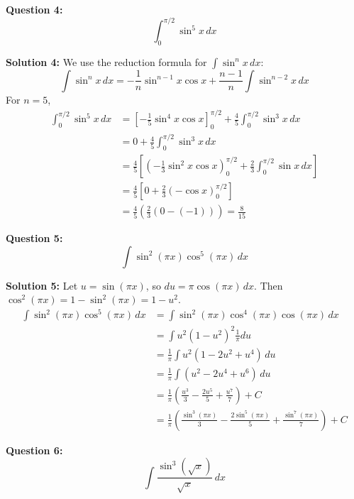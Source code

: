 \documentclass{article}
\begin{document}
\bigskip

\textbf{Question 4:}
\[ \int_0^{\pi/2} \sin^5 x \, dx \]

\textbf{Solution 4:}
\textcolor[rgb]{1.000, 0.000, 0.000}{We use the reduction formula for $\int \sin^n x \, dx$:
\[ \int \sin^n x \, dx = -\frac{1}{n} \sin^{n-1} x \cos x + \frac{n-1}{n} \int \sin^{n-2} x \, dx \]
For $n=5$,
\begin{align*} \int_0^{\pi/2} \sin^5 x \, dx &= \left[ -\frac{1}{5} \sin^4 x \cos x \right]_0^{\pi/2} + \frac{4}{5} \int_0^{\pi/2} \sin^3 x \, dx \\ &= 0 + \frac{4}{5} \int_0^{\pi/2} \sin^3 x \, dx \\ &= \frac{4}{5} \left[ \left( -\frac{1}{3} \sin^2 x \cos x \right)_0^{\pi/2} + \frac{2}{3} \int_0^{\pi/2} \sin x \, dx \right] \\ &= \frac{4}{5} \left[ 0 + \frac{2}{3} (-\cos x)_0^{\pi/2} \right] \\ &= \frac{4}{5} \left( \frac{2}{3} (0 - (-1)) \right) = \frac{8}{15} \end{align*} }

\bigskip

\textbf{Question 5:}
\[ \int \sin^2 (\pi x) \cos^5 (\pi x) \, dx \]

\textbf{Solution 5:}
\textcolor[rgb]{1.000, 0.000, 0.000}{Let $u = \sin(\pi x)$, so $du = \pi \cos(\pi x) \, dx$.  Then $\cos^2(\pi x) = 1 - \sin^2(\pi x) = 1 - u^2$.
\begin{align*} \int \sin^2 (\pi x) \cos^5 (\pi x) \, dx &= \int \sin^2 (\pi x) \cos^4 (\pi x) \cos (\pi x) \, dx \\ &= \int u^2 (1 - u^2)^2 \frac{1}{\pi} du \\ &= \frac{1}{\pi} \int u^2 (1 - 2u^2 + u^4) \, du \\ &= \frac{1}{\pi} \int (u^2 - 2u^4 + u^6) \, du \\ &= \frac{1}{\pi} \left( \frac{u^3}{3} - \frac{2u^5}{5} + \frac{u^7}{7} \right) + C \\ &= \frac{1}{\pi} \left( \frac{\sin^3 (\pi x)}{3} - \frac{2 \sin^5 (\pi x)}{5} + \frac{\sin^7 (\pi x)}{7} \right) + C \end{align*} }

\bigskip

\textbf{Question 6:}
\[ \int \frac{\sin^3 (\sqrt{x})}{\sqrt{x}} \, dx \]
\end{document}
